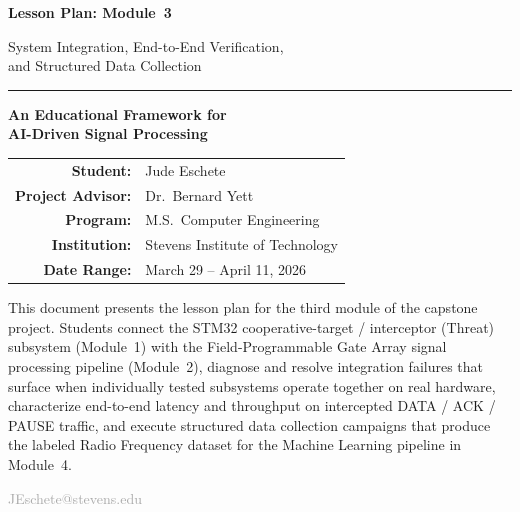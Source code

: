\documentclass[11pt,letterpaper]{article}
\begin{document}
	\begin{titlepage}
		\centering
		\vspace*{2cm}

		{\Huge\bfseries\color{stevens} Lesson Plan: Module~3\par}
		\vspace{0.5cm}
		{\LARGE\color{darkgray} System Integration, End-to-End Verification,\\[4pt]
			and Structured Data Collection\par}

		\vspace{1.5cm}
		\rule{0.6\textwidth}{1pt}
		\vspace{1.5cm}

		{\Large\textbf{An Educational Framework for\\[4pt]
				AI-Driven Signal Processing}\par}

		\vspace{1.5cm}

		\begin{tabular}{rl}
			\textbf{Student:}         & Jude Eschete \\
			\textbf{Project Advisor:} & Dr.\ Bernard Yett \\
			\textbf{Program:}         & M.S.\ Computer Engineering \\
			\textbf{Institution:}     & Stevens Institute of Technology \\
			\textbf{Date Range:}      & March 29 -- April 11, 2026 \\
		\end{tabular}

		\vspace{2cm}

		\begin{tcolorbox}[colback=lightgray, colframe=darkgray, width=0.85\textwidth, arc=2pt]
			\centering\small
			This document presents the lesson plan for the third module of the capstone project.
			Students connect the STM32 cooperative-target / interceptor (Threat) subsystem (Module~1) with the
			Field-Programmable Gate Array signal processing pipeline (Module~2), diagnose and resolve integration
			failures that surface when individually tested subsystems operate together on real hardware, characterize
			end-to-end latency and throughput on intercepted DATA / ACK / PAUSE traffic, and execute structured data
			collection campaigns that produce the labeled Radio Frequency dataset for the Machine Learning pipeline in
			Module~4.
		\end{tcolorbox}

		\vfill
		{\small\textcolor{darkgray}{JEschete@stevens.edu}}
	\end{titlepage}
\end{document}
